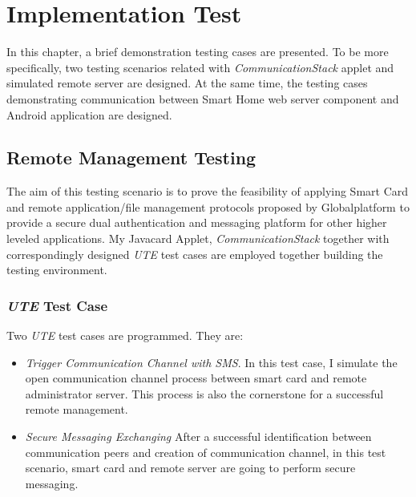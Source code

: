 \chapter{Implementation Test}
In this chapter, a brief demonstration testing cases are presented. To be more specifically, two testing scenarios related with \emph{CommunicationStack} applet and simulated remote server are designed. At the same time, the testing cases demonstrating communication between Smart Home web server component and Android application are designed.

\section{Remote Management Testing}
The aim of this testing scenario is to prove the feasibility of applying Smart Card and remote application/file management protocols proposed by Globalplatform to provide a secure dual authentication and messaging platform for other 
higher leveled applications. My Javacard Applet, \emph{CommunicationStack} together with correspondingly designed \emph{UTE} test cases are employed together building the testing environment.

\subsection{\emph{UTE} Test Case}

Two \emph{UTE} test cases are programmed. They are:
\begin{itemize}
\item \emph{Trigger Communication Channel with SMS}. In this test case, I simulate the open communication channel process between smart card and remote administrator server. This process is also the cornerstone for a successful remote management.
\item \emph{Secure Messaging Exchanging} After a successful identification between communication peers and creation of communication channel, in this test scenario, smart card and remote server are going to perform secure messaging. 
\end{itemize}

